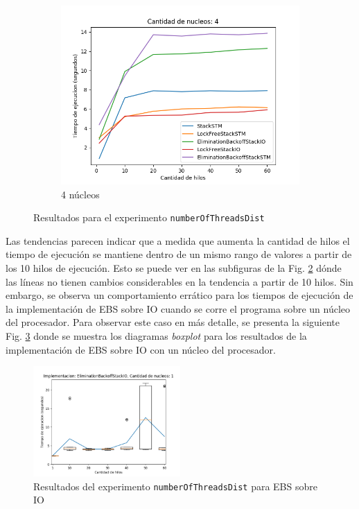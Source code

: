 \begin{figure}[t]
\begin{subfigure}[b]{0.5\textwidth}
        \includegraphics[width=\textwidth]{images/numberOfThreadsDist/plots/4.png}
        \caption{4 núcleos}
        \label{subfig:numberOfThreadsDist-4core}
    \end{subfigure}
    \caption{Resultados para el experimento \texttt{numberOfThreadsDist}}
    \label{fig:numberOfThreadsDist-all}
\end{figure}

Las tendencias parecen indicar que a medida que aumenta la cantidad de hilos el tiempo de ejecución se mantiene dentro de un mismo rango de valores a partir de los 10 hilos de ejecución. Esto se puede ver en las subfiguras de la Fig. \ref{fig:numberOfThreadsDist-all} dónde las líneas no tienen cambios considerables en la tendencia a partir de 10 hilos.
Sin embargo, se observa un comportamiento errático para los tiempos de ejecución de la implementación de EBS sobre IO cuando se corre el programa sobre un núcleo del procesador.
Para observar este caso en más detalle, se presenta la siguiente Fig. \ref{fig:numberOfThreadsDist-EBSIO} donde se muestra los diagramas \emph{boxplot} para los resultados de la implementación de EBS sobre IO con un núcleo del procesador.


\begin{figure}[t]
    \centering
    \includegraphics[width=0.5\textwidth]{images/numberOfThreadsDist/plots/expEBSIO-1.png}
    \caption{Resultados del experimento \texttt{numberOfThreadsDist} para EBS sobre IO}
    \label{fig:numberOfThreadsDist-EBSIO}
\end{figure}

